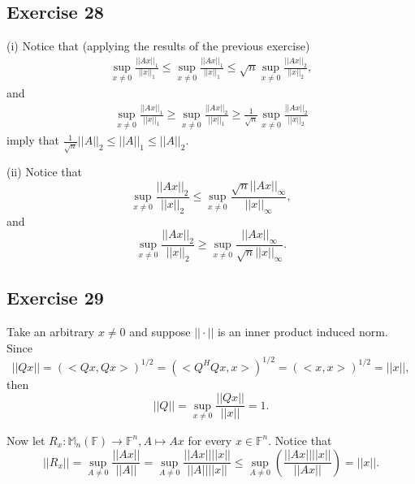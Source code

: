 \documentclass[11.5pt, letterpaper, bibtotoc,
    tablecaptionabove, figurecaptionabove]{article}
\begin{document}
\subsection*{Exercise 28}
(i)
Notice that (applying the results of the previous exercise)
\begin{align*}
    \sup_{x\neq 0}\frac{||Ax||_1}{||x||_1}\leq
    \sup_{x\neq 0}\frac{||Ax||_1}{||x||_1}\leq
    \sqrt{n}\sup_{x\neq 0}\frac{||Ax||_2}{||x||_2},
\end{align*}
and
\begin{align*}
    \sup_{x\neq 0}\frac{||Ax||_1}{||x||_1}\geq
    \sup_{x\neq 0}\frac{||Ax||_2}{||x||_1}\geq
    \frac{1}{\sqrt{n}}\sup_{x\neq 0}\frac{||Ax||_2}{||x||_2}
\end{align*}
imply that $\frac{1}{\sqrt{n}}||A||_2\leq||A||_1\leq||A||_2$.

(ii)
Notice that
\begin{equation*}
    \sup_{x\neq 0}\frac{||Ax||_2}{||x||_2}\leq
    \sup_{x\neq 0}\frac{\sqrt{n}||Ax||_\infty}{||x||_\infty},
\end{equation*}
and
\begin{equation*}
    \sup_{x\neq 0}\frac{||Ax||_2}{||x||_2}\geq
    \sup_{x\neq 0}\frac{||Ax||_\infty}{\sqrt{n}||x||_\infty}.
\end{equation*}

\subsection*{Exercise 29}
Take an arbitrary $x\neq 0$ and suppose $||\cdot||$ is an inner product induced norm.
Since
\begin{equation*}
    ||Qx||=\left(<Qx,Qx>\right)^{1/2}=
    \left(<Q^HQx,x>\right)^{1/2}=
    \left(<x,x>\right)^{1/2}=
    ||x||,
\end{equation*}
then 
\begin{equation*}
    ||Q||=\sup_{x\neq 0}\frac{||Qx||}{||x||}=1.
\end{equation*}

Now let $R_x:\mathbb M_n(\mathbb F)\to\mathbb F^n, A\mapsto Ax$ for every $x\in\mathbb F^n$.
Notice that
\begin{equation*}
    ||R_x||=\sup_{A\neq 0}\frac{||Ax||}{||A||}=
    \sup_{A\neq 0}\frac{||Ax||||x||}{||A||||x||}\leq
    \sup_{A\neq 0}\left(\frac{||Ax||||x||}{||Ax||}\right)=
    ||x||.
\end{equation*}
\end{document}
